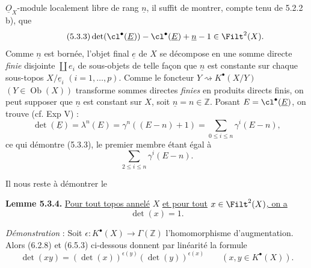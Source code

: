 
\(\underline{O}_X\)-module localement libre de rang \(\underline{n}\), il suffit de montrer, compte tenu de 5.2.2 b), que
\begin{equation}\tag{5.3.3}
 \det(\cl^{\bullet}(\underline{E}))-\cl^{\bullet}(\underline{E})+\underline{n}-1\in\Filt^2(X).
\end{equation}
Comme \(\underline{n}\) est bornée, l'objet final \(\underline{e}\) de \(X\) se décompose en une somme directe \emph{finie} disjointe \(\coprod e_i\) de sous-objets de telle façon que \(\underline{n}\) est constante sur chaque sous-topos \(X/\underline{e}_i\) \((i=1,\ldots,p)\). Comme le foncteur \(Y\rightsquigarrow K^{\bullet}(X/Y)\) \((Y\in\operatorname{Ob}(X))\) transforme sommes directes \emph{finies} en produits directs finis, on peut supposer que \(\underline n\) est constant sur \(X\), soit \(\underline n=n\in\mathbb Z\). Posant \(E=\cl^{\bullet}(\underline E)\), on trouve (cf. Exp V) :
\[
 \det(\underline{E})=\lambda^n(E)=\gamma^n((E-n)+1)
 =
 \sum_{0\leq i\leq n}\gamma^i(E-n),
\]
ce qui démontre (5.3.3), le premier membre étant égal à
\[
 \sum_{2\leq i\leq n}\gamma^i(E-n).
\]

Il nous reste à démontrer le

\textbf{Lemme 5.3.4.} \uline{Pour tout topos annelé} \(X\) \uline{et pour tout} \(x\in\Filt^2(X)\)\uline{, on a}
\[
 \det(x)=1.
\]

\emph{Démonstration} : Soit \(\epsilon:K^{\bullet}(X)\to\Gamma(\mathbb Z)\) l'homomorphisme d'augmentation. Alors (6.2.8) et (6.5.3) ci-dessous donnent par linéarité la formule
\begin{equation}\tag{5.3.5}
 \det(xy)=(\det(x))^{\epsilon(y)}(\det(y))^{\epsilon(x)}
 \qquad(x,y\in K^{\bullet}(X)).
\end{equation}
